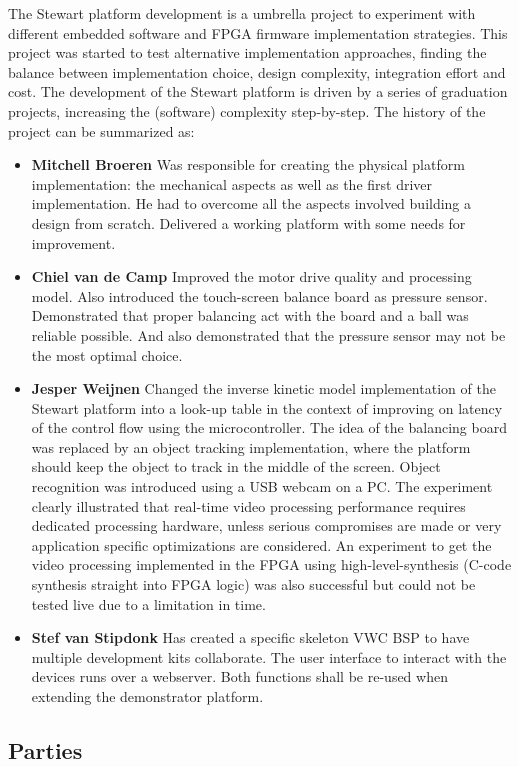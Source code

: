 \documentclass{article}
\begin{document}
The Stewart platform development is a umbrella project to experiment with
different embedded software and FPGA firmware implementation strategies. This project was started to 
test alternative implementation approaches, finding the balance between
implementation choice, design complexity, integration effort and cost. The
development of the Stewart platform is driven by a series of graduation projects,
increasing the (software) complexity step-by-step. The history of the project
can be summarized as: 
\begin{itemize} 
\item[] \textbf{Mitchell Broeren} Was
responsible for creating the physical platform implementation: the mechanical
aspects as well as the first driver implementation. He had to overcome all the
aspects involved building a design from scratch. Delivered a working platform
with some needs for improvement.
\item[]\textbf{Chiel van de
Camp} Improved the motor drive quality and processing model. Also introduced the
touch-screen balance board as pressure sensor. Demonstrated that proper
balancing act with the board and a ball was reliable possible. And also
demonstrated that the pressure sensor may not be the most optimal choice.
\item[]\textbf{Jesper Weijnen} Changed the inverse kinetic model implementation
of the Stewart platform into a look-up table in the context of improving on
latency of the control flow using the microcontroller. The idea of the balancing
board was replaced by an object tracking implementation, where the platform
should keep the object to track in the middle of the screen. Object recognition
was introduced using a USB webcam on a PC\@. The experiment clearly illustrated
that real-time video processing performance requires dedicated processing
hardware, unless serious compromises are made or very application specific
optimizations are considered. An experiment to get the video processing
implemented in the FPGA using high-level-synthesis (C-code synthesis straight
into FPGA logic) was also successful but could not be tested live due to a
limitation in time. 
\item[]\textbf{Stef van Stipdonk} Has created a specific
skeleton VWC BSP to have multiple development kits collaborate. The user
interface to interact with the devices runs over a webserver. Both functions
shall be re-used when extending the demonstrator platform. \end{itemize}
\subsection{Parties}
\end{document}
